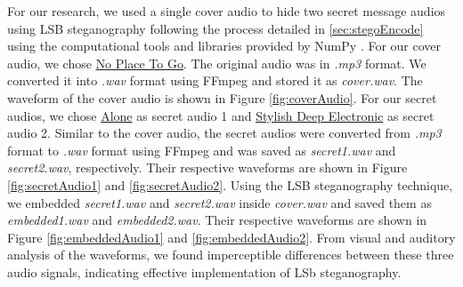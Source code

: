 \documentclass{article}
\begin{document}
For our research, we used a single cover audio to hide two secret message audios using LSB steganography following the process detailed in \ref{sec:stegoEncode} using the computational tools and libraries provided by NumPy \cite{harris2020array}. For our cover audio, we chose \href{https://pixabay.com/music/beats-no-place-to-go-216744/}{No Place To Go}. The original audio was in \textit{.mp3} format. We converted it into \textit{.wav} format using FFmpeg \cite{newmarch2017ffmpeg} and stored it as \textit{cover.wav}. The waveform of the cover audio is shown in Figure \ref{fig:coverAudio}. For our secret audios, we chose \href{https://pixabay.com/music/future-bass-alone-296348/}{Alone} as secret audio 1 and \href{https://pixabay.com/music/future-bass-stylish-deep-electronic-262632/}{Stylish Deep Electronic} as secret audio 2. Similar to the cover audio, the secret audios were converted from \textit{.mp3} format to \textit{.wav} format using FFmpeg and was saved as \textit{secret1.wav} and \textit{secret2.wav}, respectively. Their respective waveforms are shown in Figure \ref{fig:secretAudio1} and \ref{fig:secretAudio2}. Using the LSB steganography technique, we embedded \textit{secret1.wav} and \textit{secret2.wav} inside \textit{cover.wav} and saved them as \textit{embedded1.wav} and \textit{embedded2.wav}. Their respective waveforms are shown in Figure \ref{fig:embeddedAudio1} and \ref{fig:embeddedAudio2}. From visual and auditory analysis of the waveforms, we found imperceptible differences between these three audio signals, indicating effective implementation of LSb steganography.
\end{document}
